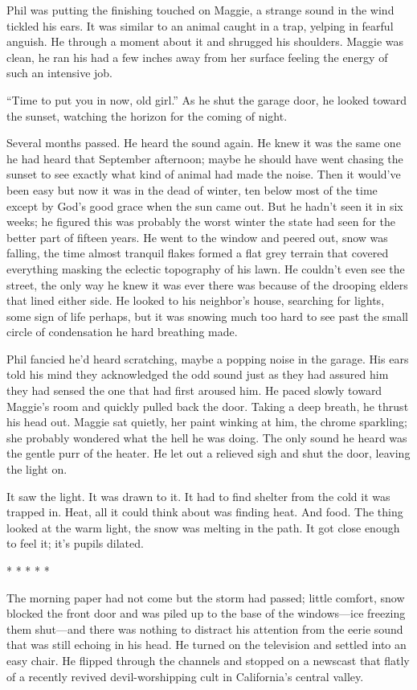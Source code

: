 Phil was putting the finishing touched on Maggie, a strange sound in the
wind tickled his ears. It was similar to an animal caught in a trap,
yelping in fearful anguish. He through a moment about it and shrugged
his shoulders. Maggie was clean, he ran his had a few inches away from
her surface feeling the energy of such an intensive job.

``Time to put you in now, old girl.'' As he shut the garage door, he
looked toward the sunset, watching the horizon for the coming of night.

Several months passed. He heard the sound again. He knew it was the same
one he had heard that September afternoon; maybe he should have went
chasing the sunset to see exactly what kind of animal had made the
noise. Then it would've been easy but now it was in the dead of winter,
ten below most of the time except by God's good grace when the sun came
out. But he hadn't seen it in six weeks; he figured this was probably
the worst winter the state had seen for the better part of fifteen
years. He went to the window and peered out, snow was falling, the time
almost tranquil flakes formed a flat grey terrain that covered
everything masking the eclectic topography of his lawn. He couldn't even
see the street, the only way he knew it was ever there was because of
the drooping elders that lined either side. He looked to his neighbor's
house, searching for lights, some sign of life perhaps, but it was
snowing much too hard to see past the small circle of condensation he
hard breathing made.

Phil fancied he'd heard scratching, maybe a popping noise in the garage.
His ears told his mind they acknowledged the odd sound just as they had
assured him they had sensed the one that had first aroused him. He paced
slowly toward Maggie's room and quickly pulled back the door. Taking a
deep breath, he thrust his head out. Maggie sat quietly, her paint
winking at him, the chrome sparkling; she probably wondered what the
hell he was doing. The only sound he heard was the gentle purr of the
heater. He let out a relieved sigh and shut the door, leaving the light
on.

It saw the light. It was drawn to it. It had to find shelter from the
cold it was trapped in. Heat, all it could think about was finding heat.
And food. The thing looked at the warm light, the snow was melting in
the path. It got close enough to feel it; it's pupils dilated.

* * * * *

The morning paper had not come but the storm had passed; little comfort,
snow blocked the front door and was piled up to the base of the
windows---ice freezing them shut---and there was nothing to distract his
attention from the eerie sound that was still echoing in his head. He
turned on the television and settled into an easy chair. He flipped
through the channels and stopped on a newscast that flatly of a recently
revived devil-worshipping cult in California's central valley.

